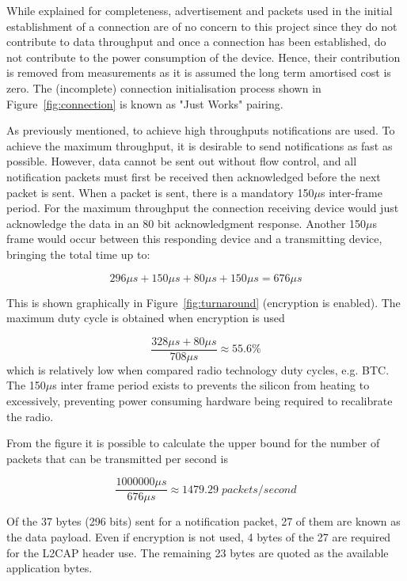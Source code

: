 \documentclass[]{article}
\begin{document}
While explained for completeness, advertisement and packets used in the initial establishment of a connection are of no concern to this project since they do not contribute to data throughput and once a connection has been established, do not contribute to the power consumption of the device. Hence, their contribution is removed from measurements as it is assumed the long term amortised cost is zero. The (incomplete) connection initialisation process shown in Figure~\ref{fig:connection} is known as "Just Works" pairing.



As previously mentioned, to achieve high throughputs notifications are used. To achieve the maximum throughput, it is desirable to send notifications as fast as possible. However, data cannot be sent out without flow control, and all notification packets must first be received then acknowledged before the next packet is sent. When a packet is sent, there is a mandatory 150$\mu$s inter-frame period. For the maximum throughput the connection receiving device would just acknowledge the data in an 80 bit acknowledgment response. Another 150$\mu$s frame would occur between this responding device and a transmitting device, bringing the total time up to:

\begin{displaymath}
296\mu s + 150\mu s + 80\mu s + 150\mu s = 676\mu s
\end{displaymath}

 This is shown graphically in Figure~\ref{fig:turnaround} (encryption is enabled). The maximum duty cycle is obtained when encryption is used 

\begin{displaymath}
\frac{328\mu s + 80\mu s}{708\mu s} \approx 55.6\%
\end{displaymath}
which is relatively low when compared radio technology duty cycles, e.g. \ac{BTC}. The 150$\mu$s inter frame period exists to prevents the silicon from heating to excessively, preventing power consuming hardware being required to recalibrate the radio. 

From the figure it is possible to calculate the upper bound for the number of packets that can be transmitted per second is

\begin{displaymath}\frac{1000000\mu s}{676\mu s} \approx  1479.29\;packets/second\end{displaymath}

Of the 37 bytes (296 bits) sent for a notification packet, 27 of them are known as the data payload. Even if encryption is not used, 4 bytes of the 27 are required for the L2CAP header use. The remaining 23 bytes are quoted as the available application bytes.
\end{document}

